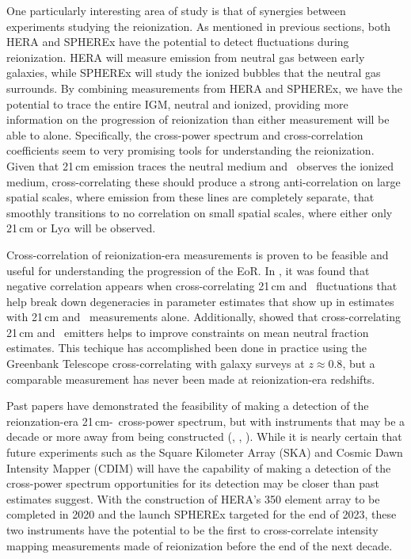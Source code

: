 One particularly interesting area of study is that of synergies between experiments
studying the reionization. As mentioned in previous sections, both HERA and SPHEREx
have the potential to
detect fluctuations during reionization. HERA will measure emission from neutral gas
between early galaxies, while SPHEREx will study the ionized bubbles that the
neutral gas surrounds. By combining measurements from HERA and SPHEREx, we have
the potential to trace the entire IGM, neutral and ionized, providing more
information on the progression of reionization than either measurement will
be able to alone. Specifically, the cross-power spectrum and cross-correlation
coefficients seem to very promising tools for understanding the reionization.
Given that 21\,cm emission traces the neutral medium and \lya\ observes the ionized
medium, cross-correlating these should produce a strong anti-correlation on large
spatial scales, where emission from these lines are completely separate, that smoothly transitions
to no correlation on small spatial scales, where either only 21\,cm or Ly$\alpha$
will be observed.

Cross-correlation of reionization-era measurements is proven to be feasible and
useful for understanding the progression of the EoR. In \cite{2017ApJ...836..176H},
it was found that negative correlation appears when cross-correlating 21\,cm and
\lya\ fluctuations that help break down degeneracies in parameter estimates that
show up in estimates with 21\,cm and \lya\ measurements alone. Additionally, \cite{2016MNRAS.459.2741S}
showed that cross-correlating 21\,cm and \lya\ emitters helps to improve constraints
on mean neutral fraction estimates. This techique has accomplished been done in practice using the
Greenbank Telescope cross-correlating with galaxy surveys at $z \approx 0.8$, but
a comparable measurement has never been made at reionization-era redshifts.

Past papers have demonstrated the feasibility of making a detection
of the reionzation-era 21\,cm-\lya\ cross-power spectrum, but with instruments that may be a decade or more away
from being constructed (\cite{2017ApJ...836..176H}, \cite{2017ApJ...848...52H}, \cite{2018MNRAS.479.2754K}).
While it is nearly certain that future experiments such as the Square Kilometer Array (SKA) and Cosmic Dawn Intensity
Mapper (CDIM) will have the capability of making a detection of the cross-power spectrum
opportunities for its detection may be closer than past estimates suggest.
With the construction of HERA's 350 element array to be completed in 2020 and
the launch SPHEREx targeted for the end of 2023, these two
instruments have the potential to be the first to cross-correlate intensity
mapping measurements made of reionization before the end of the next decade.

